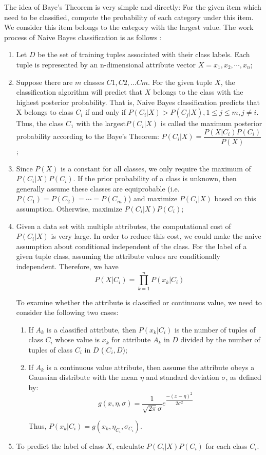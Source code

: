 \documentclass[sigconf]{acmart}
\begin{document}
The idea of Baye's Theorem is very simple and directly: For the given item which need to be classified, compute the probability of each category under this item. We consider this item belongs to the category with the largest value. The work process of Naive Bayes classification is as follows \cite{wiki.nb}:
\begin{enumerate}
    \item Let $D$ be the set of training tuples associated with their class labels. Each tuple is represented by an n-dimensional attribute vector $X={x_1,x_2,\cdots,x_n}$;
    \item Suppose there are $m$ classes $C1, C2, ... Cm$. For the given tuple $X$, the classification algorithm will predict that $X$ belongs to the class with the highest posterior probability. That is, Naive Bayes classification predicts that X belongs to class $C_i$ if and only if $P(C_i|X)>P(C_j|X), 1 \leq j\leq m, j \neq i$. Thus, the class $C_1$ with the largest$P(C_i|X)$ is called the maximum posterior probability according to the Baye's Theorem: $P(C_i|X)=\dfrac{P(X|C_i)P(C_i)}{P(X)}$;
    \item Since $P(X)$ is a constant for all classes, we only require the maximum of $P(C_i|X)P(C_i)$. If the prior probability of a class is unknown, then generally assume these classes are equiprobable (i.e. $P(C_1)=P(C_2)=\cdots= P(C_m)$) and maximize $P(C_i|X)$ based on this assumption. Otherwise, maximize $P(C_i|X)P(C_i)$;
    \item Given a data set with multiple attributes, the computational cost of $P(C_i|X)$ is very large. In order to reduce this cost, we could make the naive assumption about conditional independent of the class. For the label of a given tuple class, assuming the attribute values are conditionally independent. Therefore, we have
    \[
        P(X|C_i)=\prod_{k=1}^{n}P(x_k|C_i)
    \]
    
    To examine whether the attribute is classified or continuous value, we need to consider the following two cases:
    \begin{enumerate}
        \item If $A_k$ is a classified attribute, then $P(x_k|C_i)$ is the number of tuples of class $C_i$ whose value is $x_k$ for attribute $A_k$ in $D$ divided by the number of tuples of class $C_i$ in $D$ ($|C_i,D$);
        \item If $A_k$ is a continuous value attribute, then assume the attribute obeys a Gaussian distribute with the mean $\eta$ and standard deviation $\sigma$, as defined by:
        \[
            g(x,\eta,\sigma)=\dfrac{1}{\sqrt{2\pi}\sigma}e^{\dfrac{-(x-\eta)^2}{2\sigma^2}}
        \]
        
        Thus, $P(x_k|C_i)=g(x_k,\eta_{C_i},\sigma_{C_i})$.
    \end{enumerate}
    \item To predict the label of class $X$, calculate $P(C_i|X)P(C_i)$ for each class $C_i$.
\end{enumerate}
\end{document}
